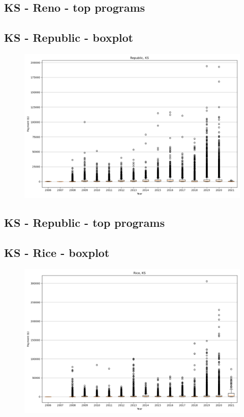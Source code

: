 \subsection*{KS - Reno - top programs}

\newpage
\subsection*{KS - Republic - boxplot}
\begin{figure}[h]
\centering
\includegraphics[width=7in]{../output/boxplots/counties/Republic-KS_boxplot.png}
\end{figure}


\subsection*{KS - Republic - top programs}

\newpage
\subsection*{KS - Rice - boxplot}
\begin{figure}[h]
\centering
\includegraphics[width=7in]{../output/boxplots/counties/Rice-KS_boxplot.png}
\end{figure}


